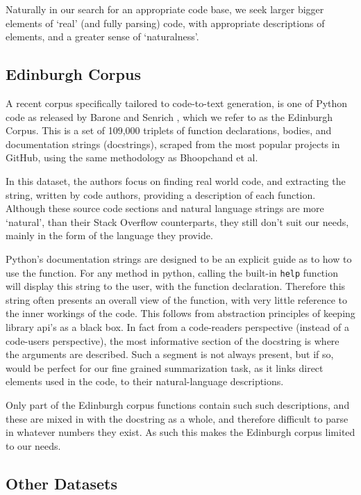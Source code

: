 Naturally in our search for an appropriate code base, we seek larger bigger elements of `real' (and fully parsing) code, with appropriate descriptions of elements, and a greater sense of `naturalness'.

\subsection{Edinburgh Corpus}

A recent corpus specifically tailored to code-to-text generation, is one of Python code as released by Barone and Senrich \cite{barone_parallel_2017}, which we refer to as the Edinburgh Corpus. 
This is a set of 109,000 triplets of function declarations, bodies, and documentation strings (docstrings), scraped from the most popular projects in GitHub, using the same methodology as Bhoopchand et al. 

In this dataset, the authors focus on finding real world code, and extracting the string, written by code authors, providing a description of each function.
Although these source code sections and natural language strings are more `natural', than their Stack Overflow counterparts, they still don't suit our needs, mainly in the form of the language they provide. 

Python's documentation strings are designed to be an explicit guide as to how to use the function. 
For any method in python, calling the built-in \texttt{help} function will display this string to the user, with the function declaration. 
Therefore this string often presents an overall view of the function, with very little reference to the inner workings of the code. 
This follows from abstraction principles of keeping library api's as a black box.
In fact from a code-readers perspective (instead of a code-users perspective), the most informative section of the docstring is where the arguments are described. 
Such a segment is not always present, but if so, would be perfect for our fine grained summarization task, as it links direct elements used in the code, to their natural-language descriptions. 

Only part of the Edinburgh corpus functions contain such such descriptions, and these are mixed in with the docstring as a whole, and therefore difficult to parse in whatever numbers they exist.
As such this makes the Edinburgh corpus limited to our needs.


\subsection{Other Datasets}


